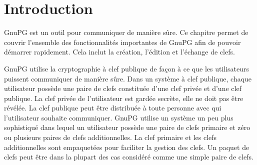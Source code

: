 \section{Introduction}

GnuPG est un outil pour communiquer de manière sûre. Ce chapitre permet de couvrir l'ensemble des fonctionnalités importantes de GnuPG afin de pouvoir démarrer rapidement. Cela inclut la création, l'édition et l'échange de clefs.

GnuPG utilise la cryptographie à clef publique de façon à ce que les utilisateurs puissent communiquer de manière sûre. Dans un système à clef publique, chaque utilisateur possède une paire de clefs constituée d'une clef privée et d'une clef publique. La clef privée de l'utilisateur est gardée secrète, elle ne doit pas être révélée. La clef publique peut être distribuée à toute personne avec qui l'utilisateur souhaite communiquer. GnuPG utilise un système un peu plus sophistiqué dans lequel un utilisateur possède une paire de clefs primaire et zéro ou plusieurs paires de clefs additionnelles. La clef primaire et les clefs additionnelles sont empaquetées pour faciliter la gestion des clefs. Un paquet de clefs peut être dans la plupart des cas considéré comme une simple paire de clefs.
 